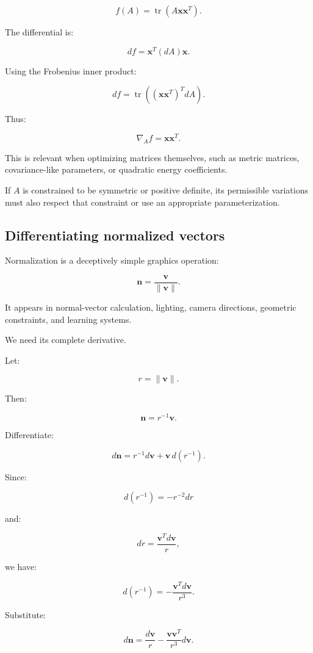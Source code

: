 \[
f(A)=\operatorname{tr}(A\mathbf x\mathbf x^T).
\]

The differential is:

\[
df=\mathbf x^T(dA)\mathbf x.
\]

Using the Frobenius inner product:

\[
df= \operatorname{tr}((\mathbf x\mathbf x^T)^TdA).
\]

Thus:

\[
\boxed{ \nabla_Af=\mathbf x\mathbf x^T }.
\]

This is relevant when optimizing matrices themselves, such as metric matrices, covariance-like parameters, or quadratic energy coefficients.

If \(A\) is constrained to be symmetric or positive definite, its permissible variations must also respect that constraint or use an appropriate parameterization.

\subsection{Differentiating normalized vectors}\label{02-foundations-ii-ch027-differentiating-normalized-vectors}

Normalization is a deceptively simple graphics operation:

\[
\mathbf n= \frac{\mathbf v}{\|\mathbf v\|}.
\]

It appears in normal-vector calculation, lighting, camera directions, geometric constraints, and learning systems.

We need its complete derivative.

Let:

\[
r=\|\mathbf v\|.
\]

Then:

\[
\mathbf n=r^{-1}\mathbf v.
\]

Differentiate:

\[
d\mathbf n = r^{-1}d\mathbf v+ \mathbf v\,d(r^{-1}).
\]

Since:

\[
d(r^{-1})=-r^{-2}dr
\]

and:

\[
dr=\frac{\mathbf v^Td\mathbf v}{r},
\]

we have:

\[
d(r^{-1}) = -\frac{\mathbf v^Td\mathbf v}{r^3}.
\]

Substitute:

\[
d\mathbf n= \frac{d\mathbf v}{r} - \frac{\mathbf v\mathbf v^T}{r^3}d\mathbf v.
\]

